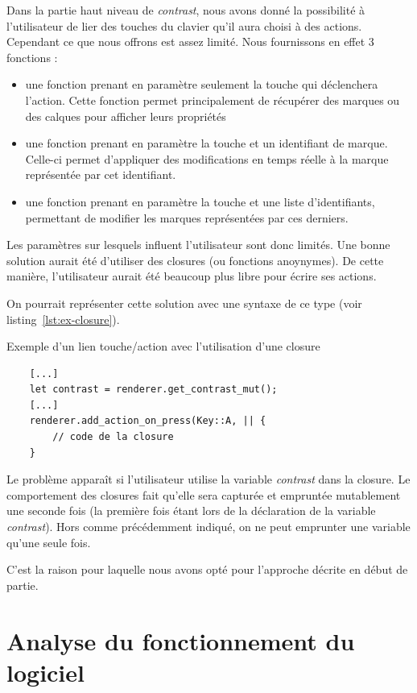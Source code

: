 \documentclass[12pt]{article}
\begin{document}
Dans la partie haut niveau de \textit{contrast}, nous avons donné la possibilité à
l'utilisateur de lier des touches du clavier qu'il aura choisi à des actions.
Cependant ce que nous offrons est assez limité. Nous fournissons en effet 3 fonctions :
\begin{itemize}
\item une fonction prenant en paramètre seulement la touche qui déclenchera l'action.
Cette fonction permet principalement de récupérer des marques ou des calques pour
afficher leurs propriétés
\item une fonction prenant en paramètre la touche et un identifiant de marque. Celle-ci 
permet d'appliquer des modifications en temps réelle à la marque représentée par cet 
identifiant.
\item une fonction prenant en paramètre la touche et une liste d'identifiants, permettant de modifier les marques représentées par ces derniers.
\end{itemize}

Les paramètres sur lesquels influent l'utilisateur sont donc limités.
Une bonne solution aurait été d'utiliser des closures (ou fonctions anoynymes). De cette
manière, l'utilisateur aurait été beaucoup plus libre pour écrire ses actions.

On pourrait représenter cette solution avec une syntaxe de ce type
(voir listing~\ref{lst:ex-closure}).
\begin{listing}[H]
    \caption{Exemple d'un lien touche/action avec l'utilisation d'une closure}
    \begin{verbatim}
    [...]
    let contrast = renderer.get_contrast_mut();
    [...]
    renderer.add_action_on_press(Key::A, || {
        // code de la closure
    }
    \end{verbatim}
    \label{lst:ex-closure}
\end{listing}

Le problème apparaît si l'utilisateur utilise la variable \textit{contrast} dans la 
closure. Le comportement des closures fait qu'elle sera capturée et empruntée 
mutablement une seconde fois (la première fois étant lors de la déclaration de la 
variable \textit{contrast}). Hors comme précédemment indiqué, on ne peut emprunter une
variable qu'une seule fois.

C'est la raison pour laquelle nous avons opté pour l'approche décrite en début de 
partie.

\section{Analyse du fonctionnement du logiciel}
\end{document}
